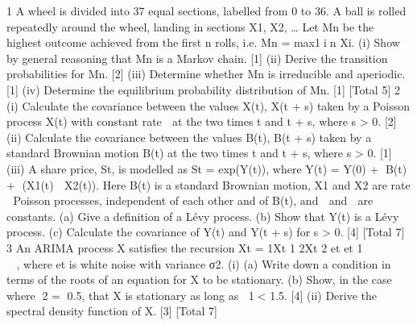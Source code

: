 \documentclass[a4paper,12pt]{article}
\begin{document}
\begin{enumerate}

1 A wheel is divided into 37 equal sections, labelled from 0 to 36. A ball is rolled
repeatedly around the wheel, landing in sections X1, X2, … Let Mn be the highest
outcome achieved from the first n rolls, i.e. Mn = max1in Xi.
(i) Show by general reasoning that Mn is a Markov chain. [1]
(ii) Derive the transition probabilities for Mn. [2]
(iii) Determine whether Mn is irreducible and aperiodic. [1]
(iv) Determine the equilibrium probability distribution of Mn. [1]
[Total 5]
2 (i) Calculate the covariance between the values X(t), X(t + s) taken by a Poisson
process X(t) with constant rate  at the two times t and t + s, where s > 0. [2]
(ii) Calculate the covariance between the values B(t), B(t + s) taken by a standard
Brownian motion B(t) at the two times t and t + s, where s > 0. [1]
(iii) A share price, St, is modelled as St = exp(Y(t)), where
Y(t) = Y(0) + B(t) + (X1(t)  X2(t)).
Here B(t) is a standard Brownian motion, X1 and X2 are rate  Poisson
processes, independent of each other and of B(t), and  and  are constants.
(a) Give a definition of a Lévy process.
(b) Show that Y(t) is a Lévy process.
(c) Calculate the covariance of Y(t) and Y(t + s) for s > 0. [4]
[Total 7]
3 An ARIMA process X satisfies the recursion
Xt = 1Xt 1 2Xt 2 et et 1        ,
where et is white noise with variance σ2.
(i) (a) Write down a condition in terms of the roots of an equation for X to be
stationary.
(b) Show, in the case where 2 = 0.5, that X is stationary as long as
1< 1.5.
[4]
(ii) Derive the spectral density function of X. [3]
[Total 7]


\end{enumerate}
\end{document}
